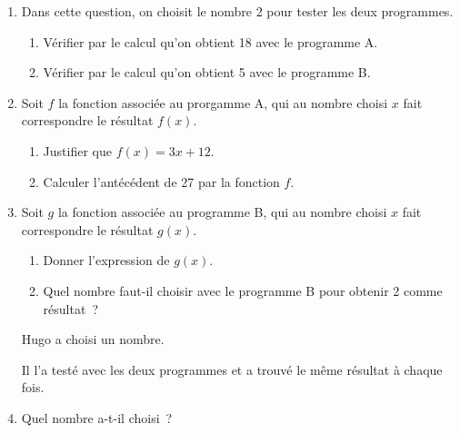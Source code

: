 \documentclass[exercice,a4]{thedocument}%
\begin{document}
    \begin{enumerate}
        \item Dans cette question, on choisit le nombre 2 pour tester les
        deux programmes.
        \begin{enumerate}
            \item Vérifier par le calcul qu'on obtient 18 avec le programme A.
            \item Vérifier par le calcul qu'on obtient 5 avec le programme B.
        \end{enumerate}
        \item Soit $f$ la fonction associée au prorgamme A, qui au nombre
        choisi $x$ fait correspondre le résultat $f(x)$.
        \begin{enumerate}
            \item Justifier que $f(x)=3x+12$.
            \item Calculer l'antécédent de 27 par la fonction $f$.
        \end{enumerate}
        \item Soit $g$ la fonction associée au programme B, qui au nombre
        choisi $x$ fait correspondre le résultat $g(x)$.
        \begin{enumerate}
            \item Donner l'expression de $g(x)$.
            \item Quel nombre faut-il choisir avec le programme B pour
            obtenir 2 comme résultat~?
        \end{enumerate}
        \begingroup\leavevmode\hspace*{-\leftmargin}%
            \begin{minipage}{.9\linewidth}
                Hugo a choisi un nombre.\par\noindent
                Il l'a testé avec les deux programmes et a trouvé le même résultat
                à chaque fois.
            \end{minipage}
        \endgroup
        \item Quel nombre a-t-il choisi~?
    \end{enumerate}
    \showthesource
\end{document}
